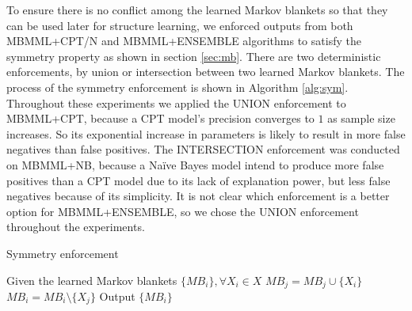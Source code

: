 To ensure there is no conflict among the learned Markov blankets so that they can be used later for structure learning, we enforced outputs from both MBMML+CPT/N and MBMML+ENSEMBLE algorithms to satisfy the symmetry property as shown in section \ref{sec:mb}. There are two deterministic enforcements, by union or intersection between two learned Markov blankets. The process of the symmetry enforcement is shown in Algorithm \ref{alg:sym}. Throughout these experiments we applied the UNION enforcement to MBMML+CPT, because a CPT model's precision converges to $1$ as sample size increases. So its exponential increase in parameters is likely to result in more false negatives than false positives. The INTERSECTION enforcement was conducted on MBMML+NB, because a Na\"ive Bayes model intend to produce more false positives than a CPT model due to its lack of explanation power, but less false negatives because of its simplicity. It is not clear which enforcement is a better option for MBMML+ENSEMBLE, so we chose the UNION enforcement throughout the experiments. 

\begin{algorithm}[]
\caption{Symmetry enforcement}
\label{alg:sym}
\begin{algorithmic}[]
\Procedure{}{} Given the learned Markov blankets $\{MB_i\}, \forall X_i \in X$
				\State $MB_j = MB_j \cup \{X_i\}$
				\State $MB_i = MB_i \setminus \{X_j\}$
			\EndIf
		\EndIf
	\EndFor
\EndFor
	\State Output $\{MB_i\}$
\EndProcedure
\end{algorithmic}
\end{algorithm}


